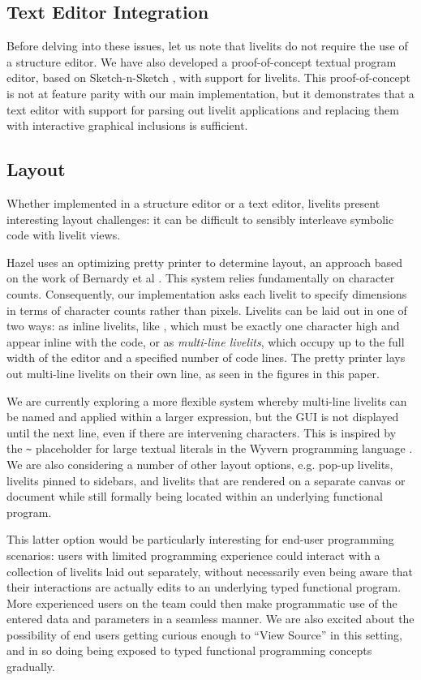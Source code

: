 \subsection{Text Editor Integration}
Before delving into these issues, let us note that livelits do not require the use of a structure editor. 
We have also developed a 
proof-of-concept textual program editor, based on Sketch-n-Sketch \cite{sns-pldi,sns-uist}, with support for livelits.
This proof-of-concept is not at feature parity with 
our main implementation, but it demonstrates that a text editor with support for 
parsing out livelit applications and replacing them with interactive graphical inclusions is sufficient.

\subsection{Layout}\label{sec:layout}
Whether implemented in a structure editor or a text editor, livelits present 
interesting layout challenges: it can be difficult to sensibly 
interleave symbolic code with livelit views. 

Hazel uses an optimizing pretty printer to determine layout, an approach 
based on the work of Bernardy et al . This system relies 
fundamentally on character counts. Consequently, our implementation asks each 
livelit to specify dimensions in terms of character counts rather than pixels.
Livelits can be laid out in one of two ways: as inline livelits, like ,
which must be exactly one character high and appear inline with the code,
or as \emph{multi-line livelits}, which occupy up to the full width of the editor 
and a specified number of code lines. The pretty printer lays out multi-line livelits
on their own line, as seen in the figures in this paper. 

We are currently exploring a more flexible system whereby 
multi-line livelits can be named and applied within a larger expression, but
the GUI is not displayed until the next line, even if there are intervening characters.
This is inspired by the \verb|~| placeholder for large textual literals in the 
Wyvern programming language \cite{TSLs}. We are also considering a number of other layout 
options, e.g. pop-up livelits, livelits pinned to sidebars, and livelits that are rendered  
on a separate canvas or document while still formally being located within an underlying functional program. 

This latter option 
would be particularly interesting for end-user programming scenarios: users with limited
programming experience 
could interact with a collection of livelits laid out separately, without necessarily
even being aware that their interactions are actually edits to an underlying typed
functional program. More experienced users on the team could then make programmatic use of the entered
data and parameters in a seamless manner. We are also excited about the possibility of end users
getting curious enough to ``View Source'' in this setting, and in so doing 
being exposed to typed functional programming concepts gradually.

